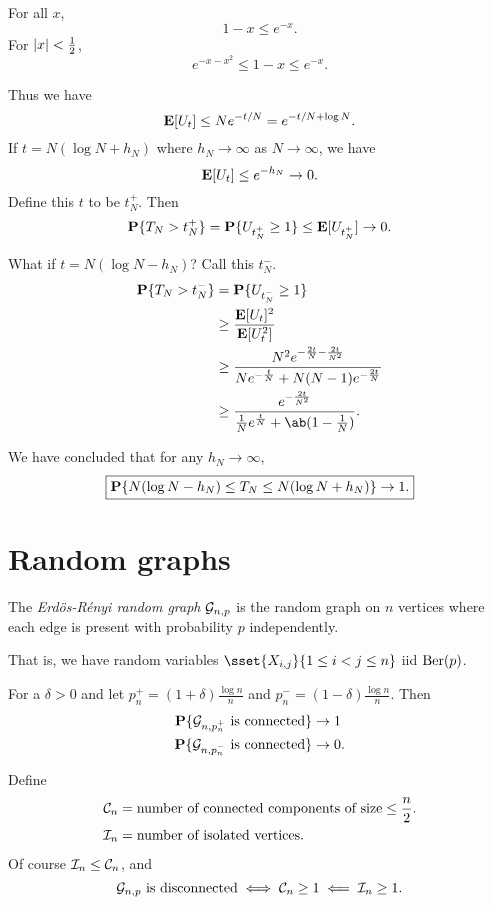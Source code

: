 \begin{proposition} \label{thm:ineq}
    For all $x$, \[
        1 - x \le e^{-x}.
    \] For $\lvert x\rvert < \frac12$, \[
        e^{-x-x^2} \le 1 - x \le e^{-x}.
    \]
\end{proposition}

Thus we have \[
    \operatorname{\mathbf E}[U_t] \le N e^{-t/N} = e^{-t/N + \log N}.
\] If $t = N(\log N + h_N)$ where $h_N \to \infty$ as $N \to \infty$,
we have \[
    \operatorname{\mathbf E}[U_t] \le e^{-h_N} \to 0.
\] Define this $t$ to be $t_N^+$.
Then \[
    \operatorname{\mathbf P}\{T_N > t_N^+\} = \operatorname{\mathbf P}\{U_{t_N^+} \ge 1\} \le \operatorname{\mathbf E}[U_{t_N^+}] \to 0.
\]

What if $t = N(\log N - h_N)$? Call this $t_N^-$.
\begin{align*}
    \P\set{T_N > t_N^-} &= \P\set{U_{t_N^-} \ge 1} \\
        &\ge \frac{\E[U_t]^2}{\E[U_t^2]} \\
        &\ge \frac{N^2 e^{-\frac{2t}N - \frac{2t}{N^2}}}
            {Ne^{-\frac tN} + N(N-1)e^{-\frac{2t}N}} \\
        &\ge \frac{e^{-\frac{2t}{N^2}}}
            {\frac1N e^{\frac tN}+ \ab(1 - \frac1N)}.
\end{align*}

We have concluded that for any $h_N \to \infty$, \[
    \boxed{
        \operatorname{\mathbf P}\{N(\log N - h_N) \le T_N \le N(\log N + h_N)\} \to 1.
    }
\]

\section{Random graphs} \label{sec:rg}
\begin{definition} \label{def:rg:er}
    The \emph{Erd\"os-R\'enyi random graph} $\mathcal{G}_{n, p}$ is the
    random graph on $n$ vertices where each edge is present with probability
    $p$ independently.

    That is, we have random variables $\sset{X_{i,j}}{1 \le i < j \le n}$
    iid $\operatorname{Ber}(p)$.
\end{definition}

\begin{theorem} \label{thm:rg:er:connected}
    For a $\delta > 0$ and let $p_n^+ = (1 + \delta) \frac{\log n}{n}$ and
    $p_n^- = (1 - \delta) \frac{\log n}{n}$.
    Then \begin{align*}
        \operatorname{\mathbf P}\{\mathcal{G}_{n, p_n^+} \text{ is connected}\} &\to 1 \\
        \operatorname{\mathbf P}\{\mathcal{G}_{n, p_n^-} \text{ is connected}\} &\to 0.
    \end{align*}
\end{theorem}

Define \begin{align*}
    \mathcal{C}_n &= \text{number of connected components of size} \le \frac n2. \\
    \mathcal{I}_n &= \text{number of isolated vertices}.
\end{align*}
Of course $\mathcal{I}_n \le \mathcal{C}_n$, and \[
    \mathcal{G}_{n,p} \text{ is disconnected}
        \iff \mathcal{C}_n \ge 1
        \impliedby \mathcal{I}_n \ge 1.
\]
